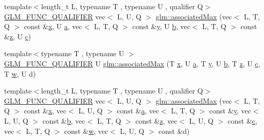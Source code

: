 \begin{DoxyCompactItemize}
\item 
{\footnotesize template$<$length\+\_\+t L, typename T , typename U , qualifier Q$>$ }\\\hyperlink{setup_8hpp_a33fdea6f91c5f834105f7415e2a64407}{G\+L\+M\+\_\+\+F\+U\+N\+C\+\_\+\+Q\+U\+A\+L\+I\+F\+I\+ER} vec$<$ L, U, Q $>$ \hyperlink{group__gtx__associated__min__max_ga19f59d1141a51a3b2108a9807af78f7f}{glm\+::associated\+Max} (vec$<$ L, T, Q $>$ const \&\hyperlink{_s_d_l__opengl_8h_ad0e63d0edcdbd3d79554076bf309fd47}{x}, U \hyperlink{_s_d_l__opengl__glext_8h_a3309789fc188587d666cda5ece79cf82}{a}, vec$<$ L, T, Q $>$ const \&\hyperlink{_s_d_l__opengl_8h_a1675d9d7bb68e1657ff028643b4037e3}{y}, U \hyperlink{_s_d_l__opengl__glext_8h_a0f71581a41fd2264c8944126dabbd010}{b}, vec$<$ L, T, Q $>$ const \&\hyperlink{_s_d_l__opengl__glext_8h_a5e74030ebb3297ce1b37ff716fedd68f}{z}, U \hyperlink{_s_d_l__opengl__glext_8h_a1f2d7f8147412c43ba2303a56f97ee73}{c})
\item 
{\footnotesize template$<$typename T , typename U $>$ }\\\hyperlink{setup_8hpp_a33fdea6f91c5f834105f7415e2a64407}{G\+L\+M\+\_\+\+F\+U\+N\+C\+\_\+\+Q\+U\+A\+L\+I\+F\+I\+ER} U \hyperlink{group__gtx__associated__min__max_ga3038ffcb43eaa6af75897a99a5047ccc}{glm\+::associated\+Max} (T \hyperlink{_s_d_l__opengl_8h_ad0e63d0edcdbd3d79554076bf309fd47}{x}, U \hyperlink{_s_d_l__opengl__glext_8h_a3309789fc188587d666cda5ece79cf82}{a}, T \hyperlink{_s_d_l__opengl_8h_a1675d9d7bb68e1657ff028643b4037e3}{y}, U \hyperlink{_s_d_l__opengl__glext_8h_a0f71581a41fd2264c8944126dabbd010}{b}, T \hyperlink{_s_d_l__opengl__glext_8h_a5e74030ebb3297ce1b37ff716fedd68f}{z}, U \hyperlink{_s_d_l__opengl__glext_8h_a1f2d7f8147412c43ba2303a56f97ee73}{c}, T \hyperlink{_s_d_l__opengl__glext_8h_a6ee8f168a7ab6785a9bb57c6715dad99}{w}, U d)
\item 
{\footnotesize template$<$length\+\_\+t L, typename T , typename U , qualifier Q$>$ }\\\hyperlink{setup_8hpp_a33fdea6f91c5f834105f7415e2a64407}{G\+L\+M\+\_\+\+F\+U\+N\+C\+\_\+\+Q\+U\+A\+L\+I\+F\+I\+ER} vec$<$ L, U, Q $>$ \hyperlink{group__gtx__associated__min__max_gaf5ab0c428f8d1cd9e3b45fcfbf6423a6}{glm\+::associated\+Max} (vec$<$ L, T, Q $>$ const \&\hyperlink{_s_d_l__opengl_8h_ad0e63d0edcdbd3d79554076bf309fd47}{x}, vec$<$ L, U, Q $>$ const \&\hyperlink{_s_d_l__opengl__glext_8h_a3309789fc188587d666cda5ece79cf82}{a}, vec$<$ L, T, Q $>$ const \&\hyperlink{_s_d_l__opengl_8h_a1675d9d7bb68e1657ff028643b4037e3}{y}, vec$<$ L, U, Q $>$ const \&\hyperlink{_s_d_l__opengl__glext_8h_a0f71581a41fd2264c8944126dabbd010}{b}, vec$<$ L, T, Q $>$ const \&\hyperlink{_s_d_l__opengl__glext_8h_a5e74030ebb3297ce1b37ff716fedd68f}{z}, vec$<$ L, U, Q $>$ const \&\hyperlink{_s_d_l__opengl__glext_8h_a1f2d7f8147412c43ba2303a56f97ee73}{c}, vec$<$ L, T, Q $>$ const \&\hyperlink{_s_d_l__opengl__glext_8h_a6ee8f168a7ab6785a9bb57c6715dad99}{w}, vec$<$ L, U, Q $>$ const \&d)

\end{DoxyCompactItemize}
